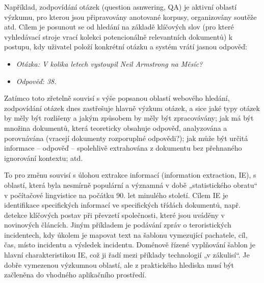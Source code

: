 \begin{multicols}{2}
Například, zodpovídání otázek (question asnwering, QA) je aktivní oblastí výzkumu, pro kterou jsou připravovány anotované korpusy, organizovány soutěže atd. Cílem je posunout se od hledání na základě klíčových slov (pro které vyhledávací stroje vrací kolekci potencionálně relevantních dokumentů) k postupu, kdy uživatel položí konkrétní otázku a systém vrátí jasnou odpověď:
\columnbreak

\begin{itemize}
\item[] \textit{Otázka: V kolika letech vystoupil Neil Armstrong na Měsíc?}
\item[] \textit{Odpověď: 38.}
\end{itemize}

Zatímco toto zřetelně souvisí s výše popsanou oblastí webového hledání, zodpovídání otázek dnes zastřešuje hlavně výzkum otázek, a sice jaké typy otázek by měly být rozlišeny a jakým způsobem by měly být zpracovávány; jak má být množina dokumentů, která teoreticky obsahuje odpověď, analyzována a porovnávána (vracejí dokumenty rozporuplné odpovědi?); jak může být určitá informace -- odpověď -- spolehlivě extrahována z dokumentu bez přehnaného ignorování kontextu; atd.

To pro změnu souvisí s úlohou extrakce informací (information extraction, IE), s oblastí, která byla nesmírně populární a významná v době „statistického obratu“ v počítačové lingvistice na počátku 90. let minulého století. Cílem IE je identifikace specifických informací ve specifických třídách dokumentů, např. detekce klíčových postav při převzetí společnosti, které jsou uváděny v novinových článcích. Jiným příkladem je podávání zpráv o teroristických incidentech, kdy úkolem je mapovat text na šablonu vymezující pachatele, cíl, čas, místo incidentu a výsledek incidentu. Doménově řízené vyplňování šablon je hlavní charakteristikou IE, což ji řadí mezi příklady technologií „v zákulisí“. Je dobře vymezenou výzkumnou oblastí, ale z praktického hlediska musí být začleněna do vhodného aplikačního prostředí.



\end{multicols}
